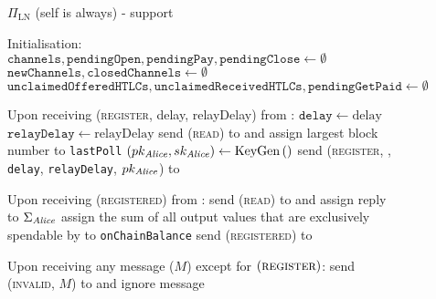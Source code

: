 \begin{figure}[!htbp]
  \begin{protocolbox}{$\Pi_{\mathrm{LN}}$ (self is \alice{} always) - support}
    \begin{algorithmic}[1]
      \State Initialisation:
      \Indent
        \State $\mathtt{channels}, \mathtt{pendingOpen}, \mathtt{pendingPay},
        \mathtt{pendingClose} \gets \emptyset$
        \State $\mathtt{newChannels}, \mathtt{closedChannels} \gets \emptyset$
        \State $\mathtt{unclaimedOfferedHTLCs}, \mathtt{unclaimedReceivedHTLCs},
        \mathtt{pendingGetPaid} \gets \emptyset$
      \EndIndent
      \State

      \State Upon receiving (\textsc{register}, delay, relayDelay) from
      \environment:
      \Indent
        \State $\mathtt{delay} \gets \mathrm{delay}$
        \label{alg:protocol:support:delay}
        \State $\mathtt{relayDelay} \gets \mathrm{relayDelay}$
        \State send (\textsc{read}) to \ledger{} and assign largest block number
        to \texttt{lastPoll}
        \label{alg:protocol:support:lastpoll}
        \State $\left(pk_{\mathit{Alice}}, sk_{\mathit{Alice}}\right) \gets
        \mathrm{KeyGen}\left(\right)$
        \label{alg:protocol:support:keygen}
        \State send (\textsc{register}, \alice, \texttt{delay},
        \texttt{relayDelay}, $pk_{\mathit{Alice}}$) to \environment
      \EndIndent
      \State

      \State Upon receiving (\textsc{registered}) from \environment:
      \Indent
        \State send (\textsc{read}) to \ledger{} and assign reply to
        $\Sigma_{\mathit{Alice}}$
        \State assign the sum of all output values that are exclusively
        spendable by \alice{} to \texttt{onChainBalance}
        \State send (\textsc{registered}) to \environment
      \EndIndent
      \State

      \State Upon receiving any message ($M$) except for
      $\left(\textsc{register}\right)$:
      \Indent
          \State send (\textsc{invalid}, $M$) to \environment{} and ignore
          message
        \EndIf
      \EndIndent
      \State


\end{algorithmic}
\end{protocolbox}
\end{figure}
